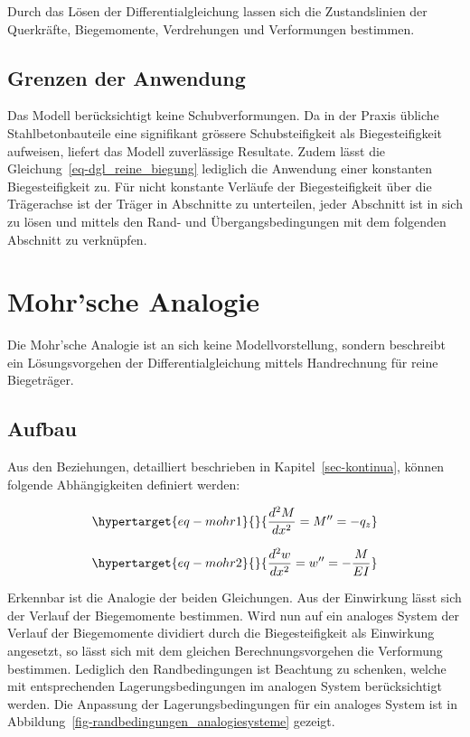 \documentclass[
  12pt,
  letterpaper,
  egregdoesnotlikesansseriftitles]{scrreprt}
\begin{document}
Durch das Lösen der Differentialgleichung lassen sich die Zustandslinien
der Querkräfte, Biegemomente, Verdrehungen und Verformungen bestimmen.

\hypertarget{grenzen-der-anwendung}{%
\subsection{Grenzen der Anwendung}\label{grenzen-der-anwendung}}

Das Modell berücksichtigt keine Schubverformungen. Da in der Praxis
übliche Stahlbetonbauteile eine signifikant grössere Schubsteifigkeit
als Biegesteifigkeit aufweisen, liefert das Modell zuverlässige
Resultate. Zudem lässt die Gleichung~\ref{eq-dgl_reine_biegung}
lediglich die Anwendung einer konstanten Biegesteifigkeit zu. Für nicht
konstante Verläufe der Biegesteifigkeit über die Trägerachse ist der
Träger in Abschnitte zu unterteilen, jeder Abschnitt ist in sich zu
lösen und mittels den Rand- und Übergangsbedingungen mit dem folgenden
Abschnitt zu verknüpfen.

\hypertarget{sec-mohrsche_analogie}{%
\section{Mohr'sche Analogie}\label{sec-mohrsche_analogie}}

Die Mohr'sche Analogie ist an sich keine Modellvorstellung, sondern
beschreibt ein Lösungsvorgehen der Differentialgleichung mittels
Handrechnung für reine Biegeträger.

\hypertarget{aufbau-1}{%
\subsection{Aufbau}\label{aufbau-1}}

Aus den Beziehungen, detailliert beschrieben in
Kapitel~\ref{sec-kontinua}, können folgende Abhängigkeiten definiert
werden:

\begin{equation}\protect\hypertarget{eq-mohr1}{}{
\frac{d^2M}{dx^2} = M'' = -q_z
}\label{eq-mohr1}\end{equation}

\begin{equation}\protect\hypertarget{eq-mohr2}{}{
\frac{d^2w}{dx^2} = w'' = -\frac{M}{EI}
}\label{eq-mohr2}\end{equation}

Erkennbar ist die Analogie der beiden Gleichungen. Aus der Einwirkung
lässt sich der Verlauf der Biegemomente bestimmen. Wird nun auf ein
analoges System der Verlauf der Biegemomente dividiert durch die
Biegesteifigkeit als Einwirkung angesetzt, so lässt sich mit dem
gleichen Berechnungsvorgehen die Verformung bestimmen. Lediglich den
Randbedingungen ist Beachtung zu schenken, welche mit entsprechenden
Lagerungsbedingungen im analogen System berücksichtigt werden. Die
Anpassung der Lagerungsbedingungen für ein analoges System ist in
Abbildung~\ref{fig-randbedingungen_analogiesysteme} gezeigt.
\end{document}
